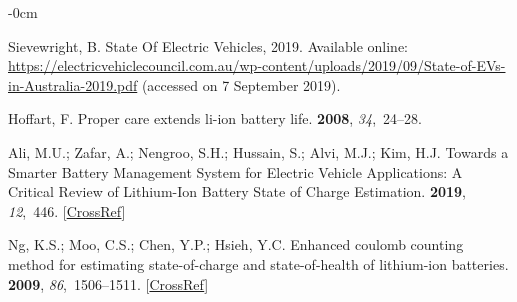 \documentclass[energies,article,accept,pdftex,moreauthors]{Definitions/mdpi}
\begin{document}
\begin{adjustwidth}{-\extralength}{0cm}



% 
\begin{thebibliography}{999}
    Sievewright, B.
    \newblock State {Of} {Electric} {Vehicles},  2019.
    \newblock Available online: \url{https://electricvehiclecouncil.com.au/wp-content/uploads/2019/09/State-of-EVs-in-Australia-2019.pdf}
    \newblock (accessed on 7 September   2019).
    
    Hoffart, F.
    \newblock Proper care extends li-ion battery life.
     {\bf 2008}, {\em 34},~24--28.
    
    
    Ali, M.U.; Zafar, A.; Nengroo, S.H.; Hussain, S.; Alvi, M.J.; Kim, H.J.
    \newblock Towards a {Smarter} {Battery} {Management} {System} for {Electric}
    {Vehicle} {Applications}: {A} {Critical} {Review} of {Lithium}-{Ion}
    {Battery} {State} of {Charge} {Estimation}.
     {\bf 2019}, {\em 12},~446. [\href{http://doi.org/10.3390/en12030446}{CrossRef}]
    
    Ng, K.S.; Moo, C.S.; Chen, Y.P.; Hsieh, Y.C.
    \newblock Enhanced coulomb counting method for estimating state-of-charge and
    state-of-health of lithium-ion batteries.
     {\bf 2009}, {\em 86},~1506--1511.
    [\href{http://dx.doi.org/10.1016/j.apenergy.2008.11.021}{CrossRef}]
    

\end{thebibliography}
\end{adjustwidth}
\end{document}
